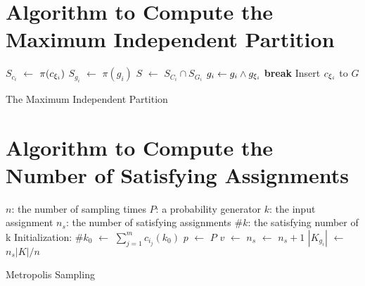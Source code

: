 
\section{Algorithm to Compute the Maximum Independent Partition}
\label{appendix:partition}


\IncMargin{1em}
\begin{algorithm}[h]
      \DontPrintSemicolon
      {
            $S_{c_i}$ $\leftarrow$ $\pi(c_{{\xi}_{i}})$ \;
            {
                  $S_{g_i}$ $\leftarrow$ $\pi(g_{i})$ \;
                  $S$ $\leftarrow$ $S_{C_i} \cap S_{G_i}$  \;
                  {
                        $g_{i} \leftarrow g_{i} \land g_{{\xi}_{i}}$ \;
                        \textbf{break} \;
                  }
                  Insert $c_{{\xi}_{i}}$ to $G$
            }
      }
      \caption{The Maximum Independent Partition}
      \label{algo:max-inde}
\end{algorithm}
\DecMargin{1em}

\section{Algorithm to Compute the Number of Satisfying Assignments}
\label{appendix:montecarlo}

\IncMargin{1em}
\begin{algorithm}
      \SetAlgoLined
      \DontPrintSemicolon


      $n$: the number of sampling times \;
      $P$: a probability generator \;
      $k$: the input assignment \;
      $n_{s}$: the number of satisfying assignments \;
      $\#k$: the satisfying number of k  \;
      Initialization: \;
      $\#{k_0}$ $\leftarrow$ $\sum_{j=1}^{m}c_{i_j}(k_0)$ \;
       {
            $p$ $\leftarrow$ $P$ \;
            {
                  $v$ $\leftarrow$  {}
            }
            {$n_{s}$ $\leftarrow$ $n_{s} + 1$}
      }
      $|K_{g_{i}}|$ $\leftarrow$ $n_s|K| / n$
      \caption{Metropolis Sampling}
\end{algorithm}
\DecMargin{1em}

